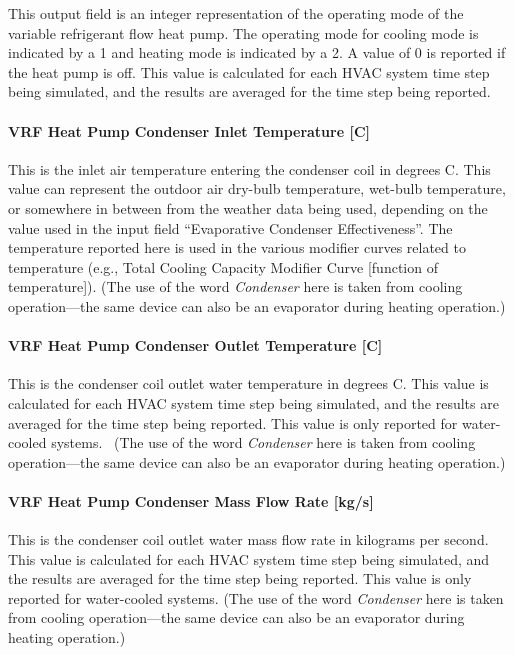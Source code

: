 This output field is an integer representation of the operating mode of the variable refrigerant flow heat pump. The operating mode for cooling mode is indicated by a 1 and heating mode is indicated by a 2. A value of 0 is reported if the heat pump is off. This value is calculated for each HVAC system time step being simulated, and the results are averaged for the time step being reported.

\paragraph{VRF Heat Pump Condenser Inlet Temperature {[}C{]}}\label{vrf-heat-pump-condenser-inlet-temperature-c}

This is the inlet air temperature entering the condenser coil in degrees C. This value can represent the outdoor air dry-bulb temperature, wet-bulb temperature, or somewhere in between from the weather data being used, depending on the value used in the input field ``Evaporative Condenser Effectiveness''. The temperature reported here is used in the various modifier curves related to temperature (e.g., Total Cooling Capacity Modifier Curve {[}function of temperature{]}). (The use of the word \emph{Condenser} here is taken from cooling operation---the same device can also be an evaporator during heating operation.)

\paragraph{VRF Heat Pump Condenser Outlet Temperature {[}C{]}}\label{vrf-heat-pump-condenser-outlet-temperature-c}

This is the condenser coil outlet water temperature in degrees C. This value is calculated for each HVAC system time step being simulated, and the results are averaged for the time step being reported. This value is only reported for water-cooled systems.~ (The use of the word \emph{Condenser} here is taken from cooling operation---the same device can also be an evaporator during heating operation.)

\paragraph{VRF Heat Pump Condenser Mass Flow Rate {[}kg/s{]}}\label{vrf-heat-pump-condenser-mass-flow-rate-kgs}

This is the condenser coil outlet water mass flow rate in kilograms per second. This value is calculated for each HVAC system time step being simulated, and the results are averaged for the time step being reported. This value is only reported for water-cooled systems. (The use of the word \emph{Condenser} here is taken from cooling operation---the same device can also be an evaporator during heating operation.)

